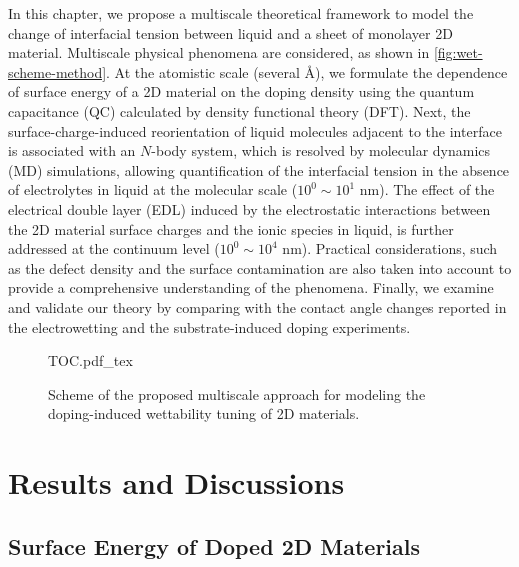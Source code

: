 In this chapter, we propose a multiscale theoretical framework to model
the change of interfacial tension between liquid and a sheet of
monolayer 2D material.
%
Multiscale physical phenomena are considered,
as shown in \autoref{fig:wet-scheme-method}. At the atomistic scale
(several \AA{}), we formulate the dependence of surface energy of a 2D
material on the doping density using the quantum capacitance (QC)
calculated by density functional theory (DFT). Next, the
surface-charge-induced reorientation of liquid molecules adjacent to
the interface is associated with an $N$-body system, which is resolved
by molecular dynamics (MD) simulations, allowing quantification of the
interfacial tension in the absence of electrolytes in liquid at the
molecular scale (\(10^{0} \sim 10^{1}\) nm).
%
The effect of the electrical
double layer (EDL) induced by the electrostatic interactions between
the 2D material surface charges and the ionic species in liquid, is
further addressed at the continuum level (\(10^{0} \sim 10^{4}\) nm).
%
Practical
considerations, such as the defect density and the surface
contamination are also taken into account to provide a comprehensive
understanding of the phenomena. Finally, we examine and validate our
theory by comparing with the contact angle changes reported in the
electrowetting and the substrate-induced doping experiments.

\begin{figure}[htbp]
  \centering
  {TOC.pdf_tex}
  \caption{\label{fig:wet-scheme-method} Scheme of the proposed
    multiscale approach for modeling the doping-induced wettability
    tuning of 2D materials. }
\end{figure}

\section{Results and Discussions}
\label{sec:wet-results}

\subsection{Surface Energy of Doped 2D Materials}
\label{sec:wet-gamma-doped}

